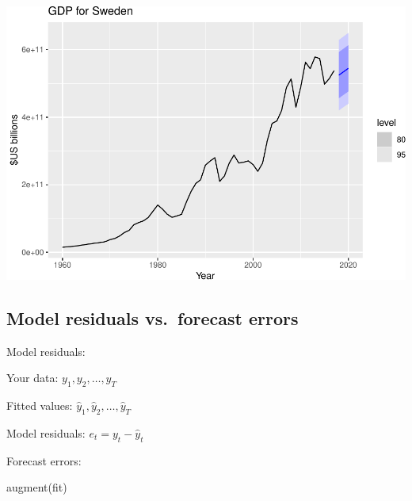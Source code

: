 \documentclass[
]{book}
\newenvironment{Shaded}{\begin{snugshade}}{\end{snugshade}}
\newcommand{\FunctionTok}[1]{\textcolor[rgb]{0.00,0.00,0.00}{#1}}
\newcommand{\NormalTok}[1]{#1}
\newcommand{\SpecialCharTok}[1]{\textcolor[rgb]{0.00,0.00,0.00}{#1}}
\newcommand{\StringTok}[1]{\textcolor[rgb]{0.31,0.60,0.02}{#1}}
\begin{document}
\begin{Shaded}
\end{Shaded}

\includegraphics{graphics/visualize forecasts-1.pdf}

\hypertarget{model-residuals-vs.-forecast-errors}{%
\subsection{Model residuals vs.~forecast errors}\label{model-residuals-vs.-forecast-errors}}

Model residuals:

Your data: \(y_1, y_2, \ldots, y_T\)

Fitted values: \(\hat{y}_1, \hat{y}_2, \ldots, \hat{y}_T\)

Model residuals: \(e_t = y_t - \hat{y}_t\)

Forecast errors:

\begin{Shaded}
\begin{Highlighting}[]
\FunctionTok{augment}\NormalTok{(fit)}
\end{Highlighting}
\end{Shaded}
\end{document}
